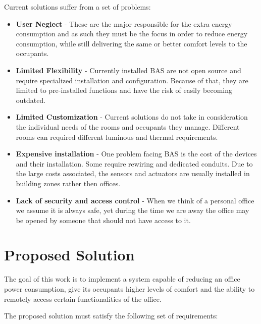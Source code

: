 Current solutions suffer from a set of problems:
\begin{itemize}
\item \textbf{User Neglect} - These are the major responsible for the extra energy consumption and as such they must be the focus in order to reduce energy consumption, while still delivering the same or better comfort levels to the occupants.
\item \textbf{Limited Flexibility} - Currently installed BAS are not open source and require specialized installation and configuration. Because of that, they are limited to pre-installed functions and have the risk of easily becoming outdated.
\item \textbf{Limited Customization} - Current solutions do not take in consideration the individual needs of the rooms and occupants they manage. Different rooms can required different luminous and thermal requirements. 
\item \textbf{Expensive installation} - One problem facing BAS is the cost of the devices and their installation. Some require rewiring  and dedicated conduits. Due to the large costs associated, the sensors and actuators are usually installed in building zones rather then offices.
\item \textbf{Lack of security and access control} - When we think of a personal office we assume it is always safe, yet during the time we are away the office may be opened by someone that should not have access to it.  
\end{itemize}



\section{Proposed Solution}
\label{section:proposed}

The goal of this work is to implement a system capable of reducing an office power consumption, give its occupants higher levels of comfort and the ability to remotely access certain functionalities of the office.


The proposed solution must satisfy the following set of requirements:

